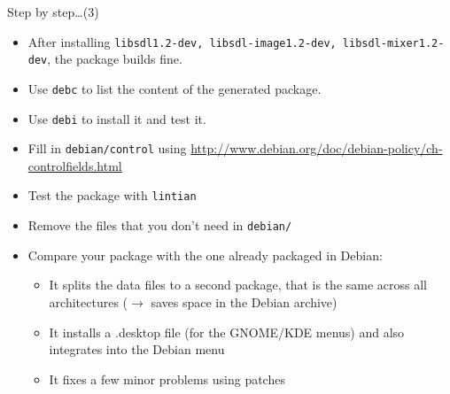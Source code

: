 \documentclass[10pt,final]{beamer}
\begin{document}
\begin{frame}{Step by step\ldots (3)}
\begin{itemize}
	\item After installing \texttt{libsdl1.2-dev, libsdl-image1.2-dev, libsdl-mixer1.2-dev}, the package builds fine.
		\hbr
	\item Use \texttt{debc} to list the content of the generated package.
		\hbr
	\item Use \texttt{debi} to install it and test it.
		\hbr
	\item Fill in \texttt{debian/control} using \url{http://www.debian.org/doc/debian-policy/ch-controlfields.html}
		\hbr
	\item Test the package with \texttt{lintian}
		\hbr
	\item Remove the files that you don't need in \texttt{debian/}
		\hbr
	\item Compare your package with the one already packaged in Debian:
		\begin{itemize}
			\item It splits the data files to a second package, that is the same across all architectures ($\rightarrow$ saves space in the Debian archive)
			\item It installs a .desktop file (for the GNOME/KDE menus) and also integrates into the Debian menu
			\item It fixes a few minor problems using patches
		\end{itemize}
\end{itemize}
\end{frame}
\end{document}
